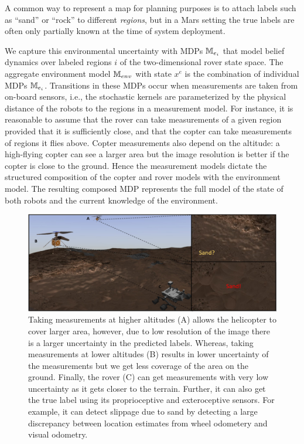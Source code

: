 \documentclass[conference]{IEEEtran}
\begin{document}
\smallskip
{}
A common way to represent a map for planning purposes is to attach labels such as ``sand'' or ``rock'' to different \emph{regions}, but in a Mars setting the true labels are often only partially known at the time of system deployment.

We capture this environmental uncertainty with MDPs $\mathbb{M}_{e_i}$ that model belief dynamics over labeled regions $i$ of the two-dimensional rover state space. The aggregate environment model $\mathbb{M}_{env}$ with state $x^e$ is the combination of individual MDPs $\mathbb{M}_{e_i}$. Transitions in these MDPs occur when measurements are taken from on-board sensors, i.e., the stochastic kernels are parameterized by the physical distance of the robots to the regions in a measurement model. For instance, it is reasonable to assume that the rover can take measurements of a given region provided that it is sufficiently close, and that the copter can take measurements of regions it flies above. Copter measurements also depend on the altitude: a high-flying copter can see a larger area but the image resolution is better if the copter is close to the ground. Hence the measurement models dictate the structured composition of the copter and rover models with the environment model. The resulting composed MDP represents the full model of the state of both robots and the current knowledge of the environment.

\begin{figure}[h!]
    \centering
    \includegraphics[width=\columnwidth]{2figs/SandDectection.png}
    \caption{Taking measurements at  higher altitudes (A) allows the helicopter to cover larger area, however, due to low resolution of the image there is a larger uncertainty in the predicted labels. Whereas, taking measurements at lower altitudes (B) results in lower uncertainty of the measurements but we get less coverage of the area on the ground. Finally, the rover (C) can get measurements with very low uncertainty as it gets closer to the terrain. Further, it can also get the true label using its proprioceptive and exteroceptive sensors. For example, it can detect slippage due to sand by detecting a large discrepancy between location estimates from wheel odometery and visual odometry.}
    \label{fig:MeasurementPossibilities}
\end{figure}
\end{document}
